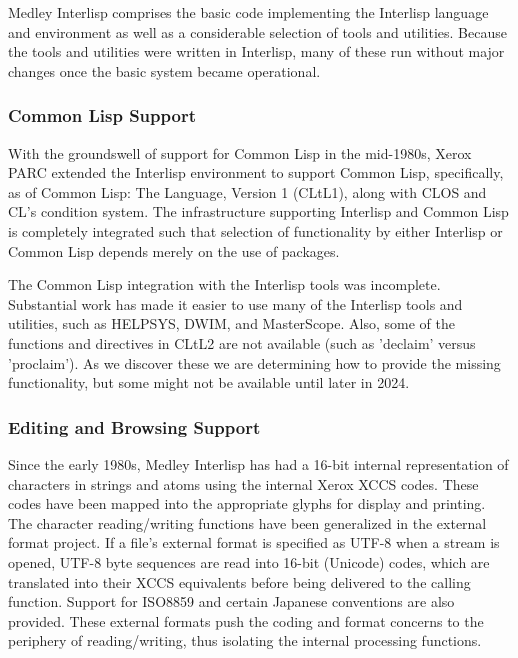 \documentclass[sigconf]{acmart}
\begin{document}
Medley Interlisp comprises the basic code implementing the Interlisp language and environment as well as a considerable selection of tools and utilities. Because the tools and utilities were written in Interlisp, many of these run without major changes once the basic system became operational.

\subsubsection{Common Lisp Support}

With the groundswell of support for Common Lisp in the mid-1980s, Xerox PARC extended the Interlisp environment to support Common Lisp, specifically, as of Common Lisp: The Language, Version 1 (CLtL1), along with CLOS and CL's condition system. The infrastructure supporting Interlisp and Common Lisp is completely integrated such that selection of functionality by either Interlisp or Common Lisp depends merely on the use of packages.



The Common Lisp integration with the Interlisp tools was incomplete. Substantial work has made it easier to use many of the Interlisp tools and utilities, such as HELPSYS, DWIM, and MasterScope. Also, some of the functions and directives in CLtL2 are not available (such as 'declaim' versus 'proclaim'). As we discover these we are determining how to provide the missing functionality, but some might not be available until later in 2024.

\subsubsection{Editing and Browsing Support}

Since the early 1980s, Medley Interlisp has had a 16-bit internal representation of characters in strings and atoms using the internal Xerox XCCS codes\cite{Nuyens86}. These codes have been mapped into the appropriate glyphs for display and printing. The character reading/writing functions have been generalized in the external format project. If a file's external format is specified as UTF-8 when a stream is opened, UTF-8 byte sequences are read into 16-bit (Unicode) codes, which are translated into their XCCS equivalents before being delivered to the calling function. Support for ISO8859 and certain Japanese conventions are also provided. These external formats push the coding and format concerns to the periphery of reading/writing, thus isolating the internal processing functions\cite{Kaplan21}.
\end{document}
